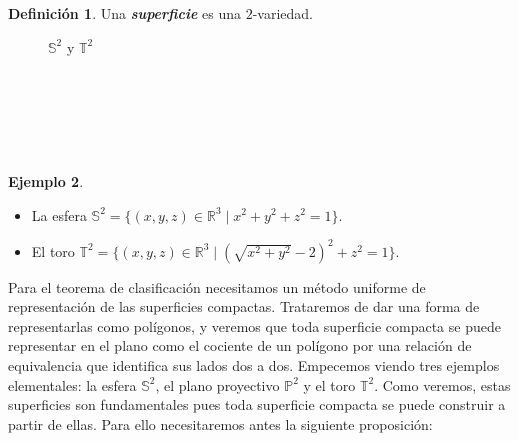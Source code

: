 \documentclass[10pt]{report}
\newcommand{\R}{\mathbb{R}}
\newcommand{\Esfera}{\mathbb{S}^2}
\newcommand{\Toro}{\mathbb{T}^2}
\newcommand{\Proyectivo}{\mathbb{P}^2}
\theoremstyle{definition}
\newtheorem{defin}{Definición}[section]
\newtheorem{eje}[defin]{Ejemplo}
\begin{document}
\begin{defin}%
Una \textbf{\emph{superficie}} es una $2$-variedad.
\end{defin}


\begin{figure}[h]%
	\begin{center}
	\caption{$\mathbb{S}^2$ y $\mathbb{T}^2$}
	\end{center}
\end{figure}

\


\

\




\begin{eje}%
\begin{itemize}
\item La esfera $\mathbb{S}^2=\{(x,y,z) \in \R^3\mid  x^2+y^2+z^2=1\}$.

\item El toro $\mathbb{T}^2=\{(x,y,z)\in \R^3\mid  (\sqrt{x^2+y^2}-2)^2+z^2=1\}$.
\end{itemize}

\end{eje}



Para el teorema de clasificación necesitamos un método uniforme de representación de las superficies compactas. Trataremos de dar una forma de representarlas como polígonos, y veremos que toda superficie compacta se puede representar en el plano como el cociente de un polígono por una relación de equivalencia que identifica sus lados dos a dos. Empecemos viendo tres ejemplos elementales: la esfera $\Esfera$, el plano proyectivo $\Proyectivo$ y el toro $\Toro$. Como veremos, estas superficies son fundamentales pues toda superficie compacta se puede construir a partir de ellas. 
Para ello necesitaremos antes la siguiente proposición:
\end{document}
